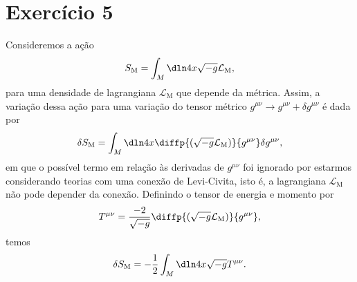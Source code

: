 \section*{Exercício 5}

Consideremos a ação
\begin{equation*}
    S_\mathrm{M} = \int_M \dln4x\sqrt{-g}\mathcal{L}_\mathrm{M},
\end{equation*}
para uma densidade de lagrangiana \(\mathcal{L}_\mathrm{M}\) que depende da métrica. Assim, a variação dessa ação para uma variação do tensor métrico \(g^{\mu\nu} \to g^{\mu\nu} + \delta g^{\mu\nu}\) é dada por
\begin{equation*}
    \delta S_\mathrm{M} = \int_M \dln4x \diffp{(\sqrt{-g}\mathcal{L}_\mathrm{M})}{g^{\mu\nu}}\delta g^{\mu\nu},
\end{equation*}
em que o possível termo em relação às derivadas de \(g^{\mu\nu}\) foi ignorado por estarmos considerando teorias com uma conexão de Levi-Civita, isto é, a lagrangiana \(\mathcal{L}_\mathrm{M}\) não pode depender da conexão. Definindo o tensor de energia e momento por
\begin{equation*}
    T^{\mu\nu} = \frac{-2}{\sqrt{-g}}\diffp{(\sqrt{-g}\mathcal{L}_\mathrm{M})}{g^{\mu\nu}},
\end{equation*}
temos
\begin{equation*}
    \delta S_\mathrm{M} = -\frac12\int_M\dln4x \sqrt{-g}T^{\mu\nu}.
\end{equation*}
